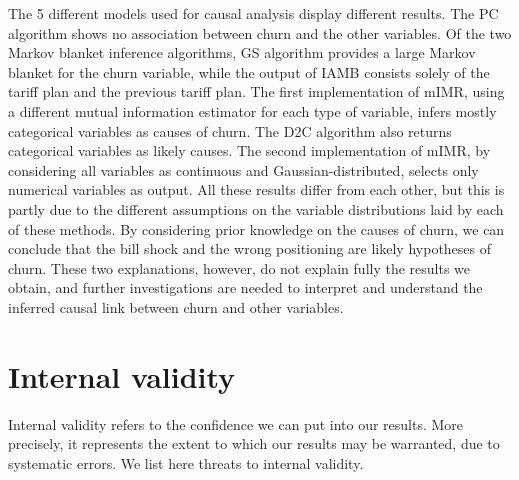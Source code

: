 The 5 different models used for causal analysis display different results. The
PC algorithm shows no association between churn and the other variables. Of the
two Markov blanket inference algorithms, GS algorithm provides a large Markov
blanket for the churn variable, while the output of IAMB consists solely of the
tariff plan and the previous tariff plan. The first implementation of mIMR,
using a different mutual information estimator for each type of variable, infers
mostly categorical variables as causes of churn. The D2C algorithm also returns
categorical variables as likely causes. The second implementation of mIMR, by
considering all variables as continuous and Gaussian-distributed, selects only
numerical variables as output. All these results differ from each other, but
this is partly due to the different assumptions on the variable distributions
laid by each of these methods. By considering prior knowledge on the causes of
churn, we can conclude that the bill shock and the wrong positioning are likely
hypotheses of churn. These two explanations, however, do not explain fully the
results we obtain, and further investigations are needed to interpret and
understand the inferred causal link between churn and other variables.

\section{Internal validity}
\label{sec:int_val}

Internal validity refers to the confidence we can put into our results. More
precisely, it represents the extent to which our results may be warranted, due
to systematic errors. We list here threats to internal validity.

